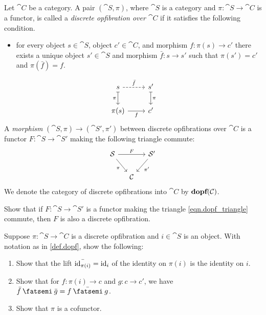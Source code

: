 \documentclass[DynamicalBook]{subfiles}
\begin{document}
\begin{definition}\label{def.dopf}
Let $\cat{C}$ be a category. A pair $(\cat{S},\pi)$, where $\cat{S}$ is a category and $\pi\colon\cat{S}\to\cat{C}$ is a functor, is called a \emph{discrete opfibration over $\cat{C}$} if it satisfies the following condition.
\begin{itemize}
	\item for every object $s\in\cat{S}$, object $c'\in\cat{C}$, and morphism $f\colon \pi(s)\to c'$ there exists a unique object $s'\in\cat{S}$ and morphism $\bar{f}\colon s\to s'$ such that $\pi(s')=c'$ and $\pi(\bar{f})=f$.
\end{itemize}
\[
\begin{tikzcd}
  s\ar[r, dashed, "\bar{f}"]\ar[d, |->, "\pi"']&
  s'\ar[d, |->, "\pi"]\\
  \pi(s)\ar[r, "f"']&
  c'
\end{tikzcd}
\]
A \emph{morphism} $(\cat{S},\pi)\to(\cat{S}',\pi')$ between discrete opfibrations over $\cat{C}$ is a functor $F\colon\cat{S}\to\cat{S}'$ making the following triangle commute:
\begin{equation}\label{eqn.dopf_triangle}
\begin{tikzcd}[column sep=small]
	\cat{S}\ar[dr, "\pi"']\ar[rr, "F"]&&
	\cat{S}'\ar[dl, "\pi'"]\\&
	\cat{C}
\end{tikzcd}
\end{equation}
We denote the category of discrete opfibrations into $\cat{C}$ by $\textbf{dopf}(\mathcal{C})$.
\end{definition}

\begin{exercise}
Show that if $F\colon \cat{S}\to\cat{S}'$ is a functor making the triangle \eqref{eqn.dopf_triangle} commute, then $F$ is also a discrete opfibration. 
\end{exercise}

\begin{exercise}\label{exc.dopf_cof}
Suppose $\pi\colon\cat{S}\to\cat{C}$ is a discrete opfibration and $i\in\cat{S}
$ is an object. With notation as in \cref{def.dopf}, show the following:
\begin{enumerate}
	\item Show that the lift $\bar{\mathrm{id}_{\pi(i)}}=\mathrm{id}_i$ of the identity on $\pi(i)$ is the identity on $i$.
	\item Show that for $f\colon\pi(i)\to c$ and $g\colon c\to c'$, we have $\bar{f}\then\bar{g}=\bar{f\then g}$.
	\item Show that $\pi$ is a cofunctor.
\qedhere
\end{enumerate}
\end{exercise}
\end{document}
